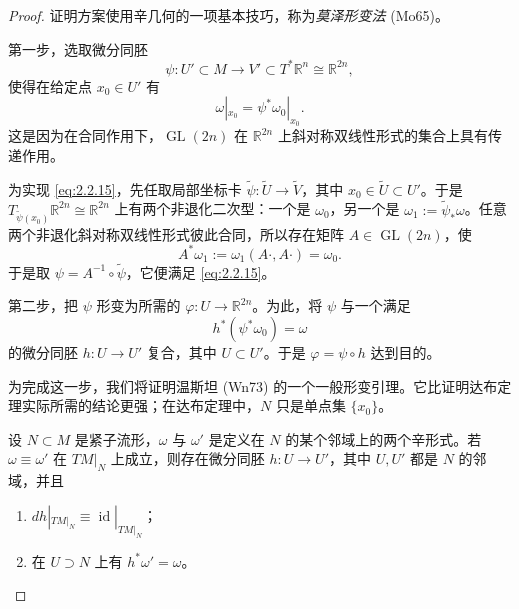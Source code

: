 \begin{proof}
证明方案使用辛几何的一项基本技巧，称为\emph{莫泽形变法} (Mo65)。

第一步，选取微分同胚
\[
  \psi:U'\subset M\longrightarrow V'\subset T^*\mathbb R^n\cong\mathbb R^{2n},
\]
使得在给定点 $x_0\in U'$ 有
\begin{equation}
  \omega|_{x_0}=\psi^*\omega_0|_{x_0}.
  \label{eq:2.2.15}
\end{equation}
这是因为在合同作用下，$\operatorname{GL}(2n)$ 在 $\mathbb R^{2n}$ 上斜对称双线性形式的集合上具有传递作用。

为实现 \eqref{eq:2.2.15}，先任取局部坐标卡
$\widetilde\psi:\widetilde U\to\widetilde V$，其中 $x_0\in\widetilde U\subset U'$。于是 $T_{\widetilde\psi(x_0)}\mathbb R^{2n}\cong\mathbb R^{2n}$ 上有两个非退化二次型：一个是 $\omega_0$，另一个是 $\omega_1:=\widetilde\psi_*\omega$。任意两个非退化斜对称双线性形式彼此合同，所以存在矩阵 $A\in\operatorname{GL}(2n)$，使
\[
  A^*\omega_1:=\omega_1(A\mathord\cdot,A\mathord\cdot)=\omega_0.
\]
于是取 $\psi=A^{-1}\circ\widetilde\psi$，它便满足 \eqref{eq:2.2.15}。

第二步，把 $\psi$ 形变为所需的 $\varphi:U\to\mathbb R^{2n}$。为此，将 $\psi$ 与一个满足
\[
  h^*(\psi^*\omega_0)=\omega
\]
的微分同胚 $h:U\to U'$ 复合，其中 $U\subset U'$。于是 $\varphi=\psi\circ h$ 达到目的。

为完成这一步，我们将证明温斯坦 (Wn73) 的一个一般形变引理。它比证明达布定理实际所需的结论更强；在达布定理中，$N$ 只是单点集 $\{x_0\}$。

\begin{lemma}[形变引理]
\label{lem:weinstein-deformation}
设 $N\subset M$ 是紧子流形，$\omega$ 与 $\omega'$ 是定义在 $N$ 的某个邻域上的两个辛形式。若
$\omega\equiv\omega'$ 在 $TM|_N$ 上成立，则存在微分同胚 $h:U\to U'$，其中 $U,U'$ 都是 $N$ 的邻域，并且
\begin{enumerate}[label=(\arabic*)]
  \item $dh|_{TM|_N}\equiv\operatorname{id}|_{TM|_N}$；
  \item 在 $U\supset N$ 上有 $h^*\omega'=\omega$。
\end{enumerate}
\end{lemma}


\end{proof}
